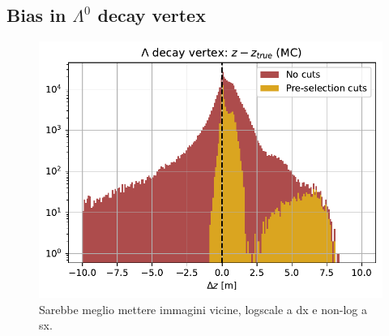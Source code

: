\subsection{Bias in $\Lambda^0$ decay vertex}
\label{sec:lambda_endvertex_bias}
\begin{figure}[t]
	\centering
	\includegraphics[width=.6\textwidth]{graphics/04-event_selection/LEVz_MC_true-residuals.pdf}
	\caption{Sarebbe meglio mettere immagini vicine, logscale a dx e non-log a sx.}
\end{figure}

